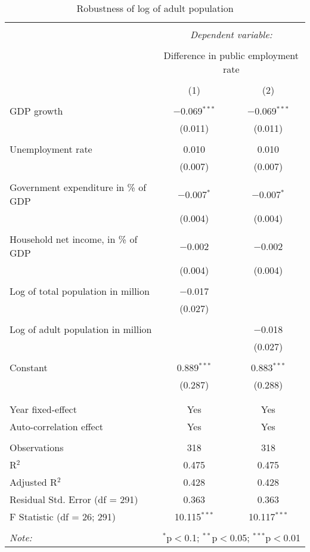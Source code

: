 \begin{table}[!htbp] \centering
  \caption{Robustness of log of adult population}
  \label{}
\begin{tabular}{@{\extracolsep{5pt}}lcc}
\\[-1.8ex]\hline
\hline \\[-1.8ex]
 & \multicolumn{2}{c}{\textit{Dependent variable:}} \\
\cline{2-3}
\\[-1.8ex] & \multicolumn{2}{c}{Difference in public employment rate} \\
\\[-1.8ex] & (1) & (2)\\
\hline \\[-1.8ex]
 GDP growth & $-$0.069$^{***}$ & $-$0.069$^{***}$ \\
  & (0.011) & (0.011) \\
  & & \\
 Unemployment rate & 0.010 & 0.010 \\
  & (0.007) & (0.007) \\
  & & \\
 Government expenditure in \% of GDP & $-$0.007$^{*}$ & $-$0.007$^{*}$ \\
  & (0.004) & (0.004) \\
  & & \\
 Household net income, in \% of GDP & $-$0.002 & $-$0.002 \\
  & (0.004) & (0.004) \\
  & & \\
 Log of total population in million & $-$0.017 &  \\
  & (0.027) &  \\
  & & \\
 Log of adult population in million &  & $-$0.018 \\
  &  & (0.027) \\
  & & \\
 Constant & 0.889$^{***}$ & 0.883$^{***}$ \\
  & (0.287) & (0.288) \\
  & & \\
\hline \\[-1.8ex]
Year fixed-effect & Yes & Yes \\
Auto-correlation effect & Yes & Yes \\
\hline \\[-1.8ex]
Observations & 318 & 318 \\
R$^{2}$ & 0.475 & 0.475 \\
Adjusted R$^{2}$ & 0.428 & 0.428 \\
Residual Std. Error (df = 291) & 0.363 & 0.363 \\
F Statistic (df = 26; 291) & 10.115$^{***}$ & 10.117$^{***}$ \\
\hline
\hline \\[-1.8ex]
\textit{Note:}  & \multicolumn{2}{r}{$^{*}$p$<$0.1; $^{**}$p$<$0.05; $^{***}$p$<$0.01} \\
\end{tabular}
\end{table}
